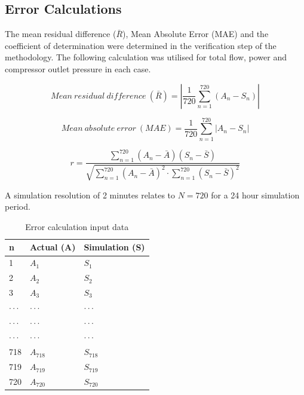 \begin{appendices}
\chapter{\hspace{0.3cm}Error Calculations}\label{Firstprinciplecalcualtions}

The mean residual difference ($\bar{R}$), Mean Absolute Error (MAE) and the coefficient of determination were determined in the verification step of the methodology. The following calculation was utilised for total flow, power and compressor outlet pressure in each case. 

\begin{equation}
Mean\ residual\ difference\ \left(\bar{R} \right) = \left| \dfrac{1}{720} \sum_{n=1}^{720}{ \left( A_{n} - S_{n}\right)} \right|
\end{equation}

\begin{equation}
Mean\ absolute\ error\ \left(MAE\right) = \dfrac{1}{720}\sum_{n=1}^{720}{\left|A_{n} - S_{n}\right| }
\end{equation}

\begin{equation}
\label{eq: Correlation coefficient}
r = \dfrac{\sum_{n=1}^{720}(A_n - \bar{A})(S_n - \bar{S})}{\sqrt{\sum_{n=1}^{720}(A_n - \bar{A})^2 \cdot \sum_{n=1}^{720}(S_n - \bar{S})^2}}
\end{equation}
\par A simulation resolution of 2 minutes relates to $N=720$ for a 24 hour simulation period.\\
\begin{table}[h!]
	\caption{Error calculation input data}
	\centering
	\begin{tabular}{p{0.5cm}|p{2.8cm}|p{2.8cm}}
		\hline
		n &Actual (A) & Simulation (S)\\
		\hline
		1 & $A_1$ & $S_1$\\
		2 & $A_2$ & $S_2$\\
		3 & $A_3$ & $S_3$\\
		$\cdot \cdot \cdot$ & $\cdot \cdot \cdot$ & $\cdot \cdot \cdot$\\
		$\cdot \cdot \cdot$ & $\cdot \cdot \cdot$ & $\cdot \cdot \cdot$\\
		$\cdot \cdot \cdot$ & $\cdot \cdot \cdot$ & $\cdot \cdot \cdot$\\
		718 & $A_{718}$ & $S_{718}$\\
		719 & $A_{719}$ & $S_{719}$\\
		720 & $A_720$ & $S_720$\\		
		\hline
	\end{tabular} 
\end{table}


\end{appendices}
